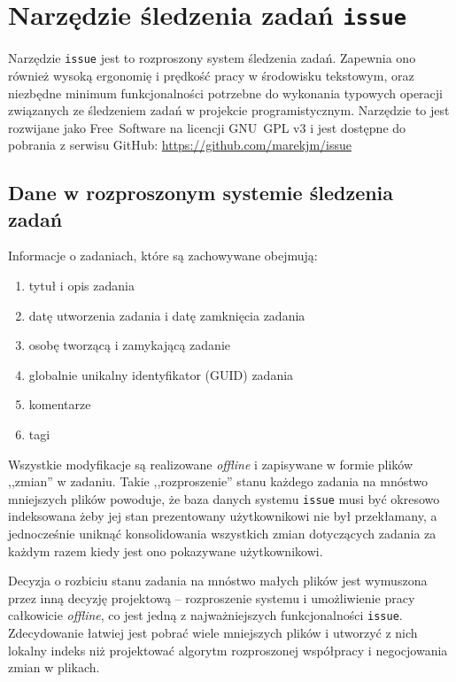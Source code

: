 \chapter{Narzędzie śledzenia zadań \texttt{issue}}
\label{issue_tracking_tool}

Narzędzie \texttt{issue} jest to rozproszony system śledzenia zadań.
Zapewnia ono również wysoką ergonomię i prędkość pracy w środowisku tekstowym,
oraz niezbędne minimum funkcjonalności potrzebne do wykonania typowych operacji
związanych ze śledzeniem zadań w projekcie programistycznym. Narzędzie to jest
rozwijane jako Free~Software na licencji GNU~GPL v3 i jest dostępne do pobrania
z serwisu GitHub: \url{https://github.com/marekjm/issue}

\section{Dane w rozproszonym systemie śledzenia zadań}

Informacje o zadaniach, które są zachowywane obejmują:

\begin{enumerate}
\item tytuł i opis zadania
\item datę utworzenia zadania i datę zamknięcia zadania
\item osobę tworzącą i zamykającą zadanie
\item globalnie unikalny identyfikator (GUID) zadania
\item komentarze
\item tagi
\end{enumerate}

Wszystkie modyfikacje są realizowane \emph{offline} i zapisywane w formie plików
,,zmian'' w zadaniu. Takie ,,rozproszenie'' stanu każdego zadania na mnóstwo
mniejszych plików powoduje, że baza danych systemu \texttt{issue} musi być
okresowo indeksowana żeby jej stan prezentowany użytkownikowi nie był
przekłamany, a jednocześnie uniknąć konsolidowania wszystkich zmian dotyczących
zadania za każdym razem kiedy jest ono pokazywane użytkownikowi.

Decyzja o rozbiciu stanu zadania na mnóstwo małych plików jest wymuszona przez
inną decyzję projektową -- rozproszenie systemu i umożliwienie pracy całkowicie
\emph{offline}, co jest jedną z najważniejszych funkcjonalności \texttt{issue}.
Zdecydowanie łatwiej jest pobrać wiele mniejszych plików i utworzyć z nich
lokalny indeks niż projektować algorytm rozproszonej współpracy i negocjowania
zmian w plikach.

